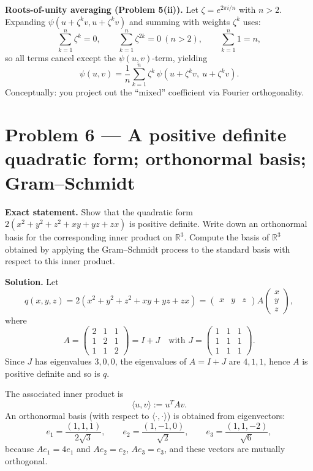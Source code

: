 \documentclass[12pt,a4paper]{article}
\theoremstyle{plain}
\theoremstyle{definition}      %
\begin{document}
\textbf{Roots-of-unity averaging (Problem 5(ii)).}
Let $\zeta=e^{2\pi i/n}$ with $n>2$.
Expanding $\psi(u+\zeta^k v,u+\zeta^k v)$ and summing with weights $\zeta^k$ uses:
\[
\sum_{k=1}^n \zeta^k=0,\qquad \sum_{k=1}^n \zeta^{2k}=0\ (n>2),\qquad \sum_{k=1}^n 1=n,
\]
so all terms cancel except the $\psi(u,v)$-term, yielding
\[
\psi(u,v)=\frac1n\sum_{k=1}^n \zeta^k\,\psi(u+\zeta^k v,\ u+\zeta^k v).
\]
Conceptually: you project out the ``mixed'' coefficient via Fourier orthogonality.



\section{Problem 6 — A positive definite quadratic form; orthonormal basis; Gram--Schmidt}

\textbf{Exact statement.}
Show that the quadratic form $2(x^2+y^2+z^2+xy+yz+zx)$ is positive definite.
Write down an orthonormal basis for the corresponding inner product on $\mathbb R^3$.
Compute the basis of $\mathbb R^3$ obtained by applying the Gram--Schmidt process to the standard basis with respect to this inner product.

\textbf{Solution.}
Let
\[
q(x,y,z)=2(x^2+y^2+z^2+xy+yz+zx)=\begin{pmatrix}x&y&z\end{pmatrix}A\begin{pmatrix}x\\y\\z\end{pmatrix},
\]
where
\[
A=\begin{pmatrix}2&1&1\\1&2&1\\1&1&2\end{pmatrix}=I+J
\quad\text{with }J=\begin{pmatrix}1&1&1\\1&1&1\\1&1&1\end{pmatrix}.
\]
Since $J$ has eigenvalues $3,0,0$, the eigenvalues of $A=I+J$ are $4,1,1$, hence $A$ is positive definite and so is $q$.

The associated inner product is
\[
\langle u,v\rangle := u^TAv.
\]
An orthonormal basis (with respect to $\langle\cdot,\cdot\rangle$) is obtained from eigenvectors:
\[
e_1=\frac{(1,1,1)}{2\sqrt3},\qquad
e_2=\frac{(1,-1,0)}{\sqrt2},\qquad
e_3=\frac{(1,1,-2)}{\sqrt6},
\]
because $Ae_1=4e_1$ and $Ae_2=e_2$, $Ae_3=e_3$, and these vectors are mutually orthogonal.
\end{document}
